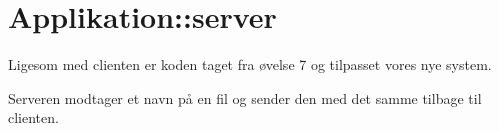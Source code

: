 \graphicspath{{Chapters/Vippefunktionalitet/}}

\chapter{Applikation::server}
Ligesom med clienten er koden taget fra øvelse 7 og tilpasset vores nye system. 

Serveren modtager et navn på en fil og sender den med det samme tilbage til clienten. 